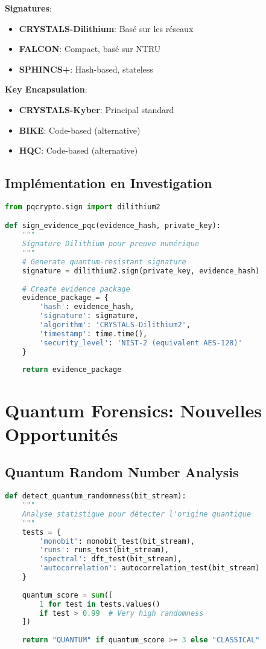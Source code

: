 \textbf{Signatures}:

\begin{itemize}
\item \textbf{CRYSTALS-Dilithium}: Basé sur les réseaux
\item \textbf{FALCON}: Compact, basé sur NTRU
\item \textbf{SPHINCS+}: Hash-based, stateless
\end{itemize}

\textbf{Key Encapsulation}:

\begin{itemize}
\item \textbf{CRYSTALS-Kyber}: Principal standard
\item \textbf{BIKE}: Code-based (alternative)
\item \textbf{HQC}: Code-based (alternative)
\end{itemize}

\subsection{Implémentation en Investigation}
\begin{lstlisting}[language=Python, caption=Signature post-quantique pour evidence]
from pqcrypto.sign import dilithium2

def sign_evidence_pqc(evidence_hash, private_key):
    """
    Signature Dilithium pour preuve numérique
    """
    # Generate quantum-resistant signature
    signature = dilithium2.sign(private_key, evidence_hash)
    
    # Create evidence package
    evidence_package = {
        'hash': evidence_hash,
        'signature': signature,
        'algorithm': 'CRYSTALS-Dilithium2',
        'timestamp': time.time(),
        'security_level': 'NIST-2 (equivalent AES-128)'
    }
    
    return evidence_package
\end{lstlisting}

\section{Quantum Forensics: Nouvelles Opportunités}
\subsection{Quantum Random Number Analysis}
\begin{lstlisting}[language=Python, caption=Détection de QRNG vs PRNG]
def detect_quantum_randomness(bit_stream):
    """
    Analyse statistique pour détecter l'origine quantique
    """
    tests = {
        'monobit': monobit_test(bit_stream),
        'runs': runs_test(bit_stream),
        'spectral': dft_test(bit_stream),
        'autocorrelation': autocorrelation_test(bit_stream)
    }
    
    quantum_score = sum([
        1 for test in tests.values()
        if test > 0.99  # Very high randomness
    ])
    
    return "QUANTUM" if quantum_score >= 3 else "CLASSICAL"
\end{lstlisting}

